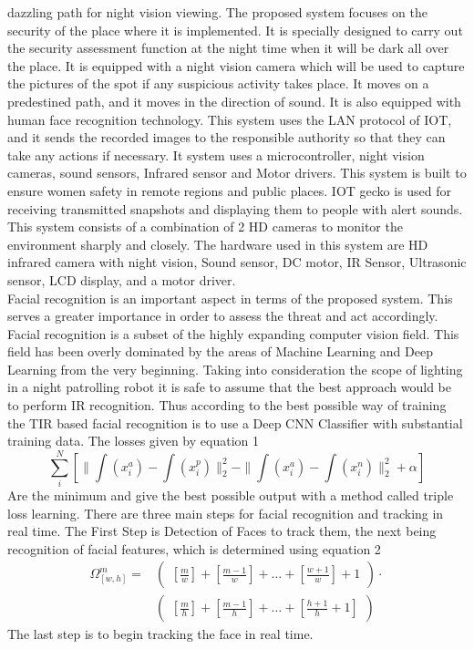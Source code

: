 \documentclass[journal]{IEEEtran}
\begin{document}
dazzling path for night vision viewing.\cite{[12]}
The proposed system focuses on the security of the place
where it is implemented. It is specially designed to
carry out the security assessment function at the night
time when it will be dark all over the place. It is equipped
with a night vision camera which will be used to capture
the pictures of the spot if any suspicious activity takes
place. It moves on a predestined path, and it moves in
the direction of sound. It is also equipped with human
face recognition technology. This system uses the LAN
protocol of IOT, and it sends the recorded images to the
responsible authority so that they can take any actions
if necessary. It system uses a microcontroller, night
vision cameras, sound sensors, Infrared sensor and Motor
drivers.\cite{[15]}
This system is built to ensure women safety in remote
regions and public places. IOT gecko is used for
receiving transmitted snapshots and displaying them to
people with alert sounds. This system consists of a
combination of 2 HD cameras to monitor the environment
sharply and closely. The hardware used in this system are
HD infrared camera with night vision, Sound sensor,
DC motor, IR Sensor, Ultrasonic sensor, LCD display, and
a motor driver.\cite{[16]}\\

Facial recognition is an important aspect in terms of the
proposed system. This serves a greater importance in order
to assess the threat and act accordingly.\cite{[2]} Facial
recognition is a subset of the highly expanding computer
vision field. This field has been overly dominated by the
areas of Machine Learning and Deep Learning from the very
beginning\cite{[5]}. Taking into consideration the scope of
lighting in a night patrolling robot it is safe to assume
that the best approach would be to perform IR recognition\cite{[2]}.
Thus according to \cite{[2]} the best possible way of training
the TIR based facial recognition is to use a Deep CNN
Classifier with substantial training data. The losses
given by equation 1
\begin{equation}
	\sum_i^N[\| \int (x_i^a) - \int (x_i^p)\|_2^2 - \| \int (x_i^a) - \int (x_i^n)\|_2^2 + \alpha]
\end{equation}
Are the minimum and give the best possible output with a
method called triple loss learning.\cite{[2]} There are
three main steps for facial recognition and tracking in
real time\cite{[4]}. The First Step is Detection of Faces to track
them, the next being recognition of facial features, which is determined
using equation 2
\begin{equation}
	\begin{aligned}
		\Omega^m_{[w, h]} =
		 & \begin{pmatrix}
			[\frac{m}{w}] + [\frac{m - 1}{w}] + \ldots + [\frac{w + 1}{w}] + 1
		\end{pmatrix}
		\cdot                        \\
		 & \begin{pmatrix}
			[\frac{m}{h}] + [\frac{m - 1}{h}] + \ldots + [\frac{h + 1}{h} + 1]
		\end{pmatrix}
	\end{aligned}
\end{equation}
The last step is to begin tracking the face in real time.
\end{document}
